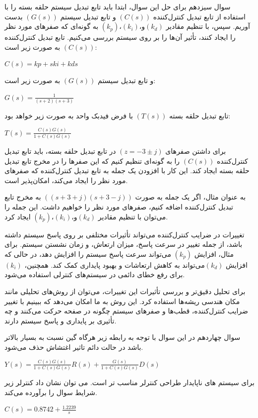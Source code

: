 \documentclass{article}
\begin{document}
\begin{problem}{سوال سیزدهم}
	برای حل این سوال، ابتدا باید تابع تبدیل سیستم حلقه بسته را با استفاده از تابع تبدیل کنترل‌کننده $( C(s) )$ و تابع تبدیل سیستم $( G(s) )$ بدست آوریم. سپس، با تنظیم مقادیر $( k_p )، ( k_i )، و ( k_d )$ به گونه‌ای که صفرهای مورد نظر را ایجاد کنند، تأثیر آن‌ها را بر روی سیستم بررسی می‌کنیم.
	تابع تبدیل کنترل‌کننده $( C(s) )$ به صورت زیر است:
	
	\raggedleft
	
	$C(s)=kp​+ski​​+kd​s$
	
	\raggedright
	
	و تابع تبدیل سیستم $( G(s) )$ به صورت زیر است:
	
	\raggedleft
	$G(s)=\frac{1}{(s+2)(s+3)}$
	
	\raggedright
	
	تابع تبدیل حلقه بسته $( T(s) )$ با فرض فیدبک واحد به صورت زیر خواهد بود:
	
	\raggedleft
	$T(s)=\frac{C(s)G(s)}{1+C(s)G(s)}$
	
	\raggedright
	
	برای داشتن صفرهای $( z = -3 \pm j )$ در تابع تبدیل حلقه بسته، باید تابع تبدیل کنترل‌کننده $( C(s) )$ را به گونه‌ای تنظیم کنیم که این صفرها را در مخرج تابع تبدیل حلقه بسته ایجاد کند. این کار با افزودن یک جمله به تابع تبدیل کنترل‌کننده که صفرهای مورد نظر را ایجاد می‌کند، امکان‌پذیر است.
	
	به عنوان مثال، اگر یک جمله به صورت $( (s + 3 + j)(s + 3 - j) )$ به مخرج تابع تبدیل کنترل‌کننده اضافه کنیم، صفرهای مورد نظر را خواهیم داشت. این جمله را می‌توان با تنظیم مقادیر $( k_p )،( k_i )، و ( k_d )$ ایجاد کرد.
	
	تغییرات در ضرایب کنترل‌کننده می‌تواند تأثیرات مختلفی بر روی پاسخ سیستم داشته باشد، از جمله تغییر در سرعت پاسخ، میزان ارتعاش، و زمان نشستن سیستم. برای مثال، افزایش $( k_p )$ می‌تواند سرعت پاسخ سیستم را افزایش دهد، در حالی که افزایش $( k_d ) $می‌تواند به کاهش ارتعاشات و بهبود پایداری کمک کند. همچنین، $( k_i )$ برای رفع خطای دائمی در سیستم‌های کنترلی استفاده می‌شود.
	
	برای تحلیل دقیق‌تر و بررسی تأثیرات این تغییرات، می‌توان از روش‌های تحلیلی مانند مکان هندسی ریشه‌ها استفاده کرد. این روش به ما امکان می‌دهد که ببینیم با تغییر ضرایب کنترل‌کننده، قطب‌ها و صفرهای سیستم چگونه در صفحه  حرکت می‌کنند و چه تأثیری بر پایداری و پاسخ سیستم دارند.
	
	
\end{problem}


\begin{problem}{سوال چهاردهم}
	در این سوال با توجه به رابطه زیر هرگاه گین 
	نسبت به 
	بسیار بالاتر باشد در حالت دائم تاثیر اغتشاش حذف می‌شود.
	
	\raggedleft
	$Y(s) = \frac{C(s)G(s)}{1 + C(s)G(s)} R(s) + \frac{G(s)}{1 + C(s)G(s)} D(s)$
	
	\raggedright
	
	برای سیستم های ناپایدار طراحی کنترلر  مناسب تر است.
	می توان نشان داد کنترلر زیر شرایط سوال را برآورده می‌کند.
	
	\raggedleft
	$C(s) = 0.8742 + \frac{1.2239}{s}$

	

	
\end{problem}
\end{document}
